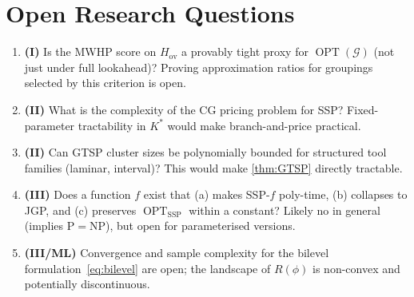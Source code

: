 \documentclass[11pt,a4paper]{article}
\theoremstyle{plain}
\theoremstyle{definition}
\DeclareMathOperator{\OPT}{OPT}
\newcommand{\calG}{\mathcal{G}}
\newcommand{\Kstar}{K^{*}}
\begin{document}
\section{Open Research Questions}
\label{sec:open}

\begin{enumerate}[label=\textbf{Q\arabic*.},leftmargin=*]
  \item \textbf{(I)} Is the MWHP score on $H_{\mathrm{ov}}$ a provably tight
        proxy for $\OPT(\calG)$ (not just under full lookahead)?
        Proving approximation ratios for groupings selected by this criterion is open.
  \item \textbf{(II)} What is the complexity of the CG pricing problem for SSP?
        Fixed-parameter tractability in $\Kstar$ would make branch-and-price practical.
  \item \textbf{(II)} Can GTSP cluster sizes be polynomially bounded for structured
        tool families (laminar, interval)? This would make \cref{thm:GTSP} directly tractable.
  \item \textbf{(III)} Does a function $f$ exist that (a) makes SSP-$f$ poly-time,
        (b) collapses to JGP, and (c) preserves $\OPT_{\mathrm{SSP}}$ within a constant?
        Likely no in general (implies P$=$NP), but open for parameterised versions.
  \item \textbf{(III/ML)} Convergence and sample complexity for the bilevel
        formulation~\eqref{eq:bilevel} are open; the landscape of $R(\phi)$ is
        non-convex and potentially discontinuous.
\end{enumerate}
\end{document}
